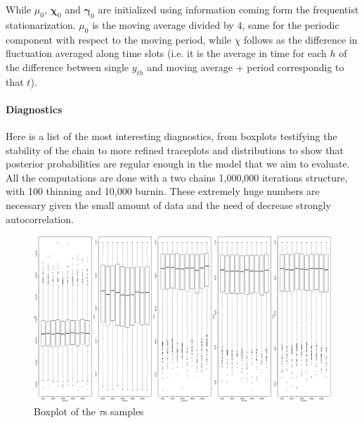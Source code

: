 \documentclass[11pt,twoside]{report}
\begin{document}
While $ \mu_0 $, $ \boldsymbol{\chi}_{0} $ and $ \boldsymbol{\gamma}_{0} $ are initialized using information coming form the frequentist stationarization. $ \mu_0 $ is the moving average divided by $ 4 $, same for the periodic component with respect to the moving period, while $ \chi $ follows as the difference in fluctuation averaged  along time slots (i.e. it is the average in time for each $ h $ of the difference between single $ y_{th} $ and moving average + period correspondig to that $ t $).

\paragraph{Diagnostics}
Here is a list of the most interesting diagnostics, from boxplots testifying the stability of the chain to more refined traceplots and distributions to show that posterior probabilities are regular enough in the model that we aim to evaluate. All the computations are done with a two chains 1,000,000 iterations structure, with 100 thinning and 10,000 burnin. These extremely huge numbers are necessary given the small amount of data and the need of decrease strongly autocorrelation.

\begin{figure}[H]
		\centering
		\includegraphics[width=100 mm]{pictures/taus.png}
		\caption{Boxplot of the $ \tau $s samples}
		\label{fig:taus}
\end{figure}
\end{document}
